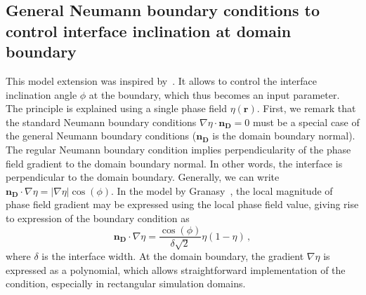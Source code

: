 	\subsection{General Neumann boundary conditions to control interface inclination at domain boundary}\label{sec_general_NBC_ch_NPA_PF}
	This model extension was inspired by~\cite{Granasy2007}. It allows to control the interface inclination angle $\phi$ at the boundary, which thus becomes an input parameter. The principle is explained using a single phase field $\eta(\bm{r})$. 
	First, we remark that the standard Neumann boundary conditions $\nabla\eta\cdot\bm{n_D}=0$ must be a special case of the general Neumann boundary conditions ($\bm{n_D}$ is the domain boundary normal). The regular Neumann boundary condition implies perpendicularity of the phase field gradient to the domain boundary normal. In other words, the interface is perpendicular to the domain boundary. Generally, we can write $\bm{n_D}\cdot \nabla\eta=|\nabla\eta|\cos(\phi)$. In the model by Granasy~\cite{Granasy2007}, the local magnitude of phase field gradient may be expressed using the local phase field value, giving rise to expression of the boundary condition as
	\begin{equation}
		\bm{n_D}\cdot \nabla\eta=\frac{\cos(\phi)}{\delta\sqrt{2}}\eta(1-\eta)\,,
	\end{equation}
	where $\delta$ is the interface width. At the domain boundary, the gradient $\nabla\eta$ is expressed as a polynomial, which allows straightforward implementation of the condition, especially in rectangular simulation domains.\\
	
